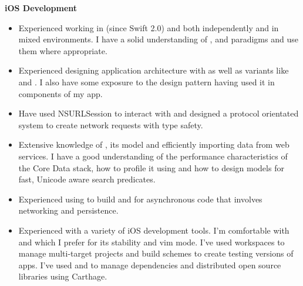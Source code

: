 \textbf{iOS Development}
\begin{itemize}
\item Experienced working in  (since Swift 2.0) and
   both independently and in mixed environments. I have a
  solid understanding of , 
  and  paradigms and use them where appropriate.
\item Experienced designing application architecture with  as well as
  variants like  and . I also have some exposure to
  the  design pattern having used it in components of my app.
\item Have used NSURLSession to interact with  and
  designed a protocol orientated system to create network requests with type
  safety.
\item Extensive knowledge of , its  model
  and efficiently importing data from web services. I have a good understanding
  of the performance characteristics of the Core Data stack, how to profile it
  using  and how to design models for fast, Unicode aware
  search predicates.
\item Experienced using  to build  and
   for asynchronous code that involves networking and
  persistence.
\item Experienced with a variety of iOS development tools. I'm comfortable with
   and  which I prefer for its stability and vim
  mode. I've used workspaces to manage multi-target projects and build schemes
  to create testing versions of apps. I've used  and
   to manage dependencies and distributed open source libraries
  using Carthage.
\end{itemize}


